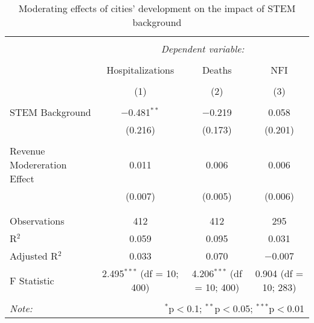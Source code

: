 
\begin{table}[!htbp] \centering 
  \caption{Moderating effects of cities’ development on the impact of STEM background} 
  \label{} 
\begin{tabular}{@{\extracolsep{5pt}}lccc} 
\\[-1.8ex]\hline 
\hline \\[-1.8ex] 
 & \multicolumn{3}{c}{\textit{Dependent variable:}} \\ 
\cline{2-4} 
\\[-1.8ex] & Hospitalizations & Deaths & NFI \\ 
\\[-1.8ex] & (1) & (2) & (3)\\ 
\hline \\[-1.8ex] 
 STEM Background & $-$0.481$^{**}$ & $-$0.219 & 0.058 \\ 
  & (0.216) & (0.173) & (0.201) \\ 
  & & & \\ 
 Revenue Modereration Effect & 0.011 & 0.006 & 0.006 \\ 
  & (0.007) & (0.005) & (0.006) \\ 
  & & & \\ 
\hline \\[-1.8ex] 
Observations & 412 & 412 & 295 \\ 
R$^{2}$ & 0.059 & 0.095 & 0.031 \\ 
Adjusted R$^{2}$ & 0.033 & 0.070 & $-$0.007 \\ 
F Statistic & 2.495$^{***}$ (df = 10; 400) & 4.206$^{***}$ (df = 10; 400) & 0.904 (df = 10; 283) \\ 
\hline 
\hline \\[-1.8ex] 
\textit{Note:}  & \multicolumn{3}{r}{$^{*}$p$<$0.1; $^{**}$p$<$0.05; $^{***}$p$<$0.01} \\ 
\end{tabular} 
\end{table} 
